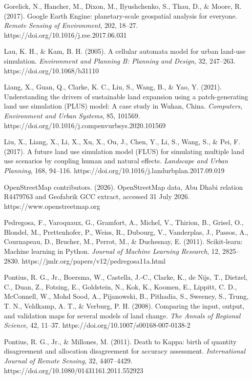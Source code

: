 Gorelick, N., Hancher, M., Dixon, M., Ilyushchenko, S., Thau, D., \&
Moore, R. (2017). Google Earth Engine: planetary-scale geospatial
analysis for everyone. \emph{Remote Sensing of Environment}, 202,
18--27. https://doi.org/10.1016/j.rse.2017.06.031

Lau, K. H., \& Kam, B. H. (2005). A cellular automata model for urban
land-use simulation. \emph{Environment and Planning B: Planning and
Design}, 32, 247--263. https://doi.org/10.1068/b31110

Liang, X., Guan, Q., Clarke, K. C., Liu, S., Wang, B., \& Yao, Y.
(2021). Understanding the drivers of sustainable land expansion using a
patch-generating land use simulation (PLUS) model: A case study in
Wuhan, China. \emph{Computers, Environment and Urban Systems}, 85,
101569. https://doi.org/10.1016/j.compenvurbsys.2020.101569

Liu, X., Liang, X., Li, X., Xu, X., Ou, J., Chen, Y., Li, S., Wang, S.,
\& Pei, F. (2017). A future land use simulation model (FLUS) for
simulating multiple land use scenarios by coupling human and natural
effects. \emph{Landscape and Urban Planning}, 168, 94--116.
https://doi.org/10.1016/j.landurbplan.2017.09.019

OpenStreetMap contributors. (2026). OpenStreetMap data, Abu Dhabi
relation R4479763 and Geofabrik GCC extract, accessed 31 July 2026.
https://www.openstreetmap.org

Pedregosa, F., Varoquaux, G., Gramfort, A., Michel, V., Thirion, B.,
Grisel, O., Blondel, M., Prettenhofer, P., Weiss, R., Dubourg, V.,
Vanderplas, J., Passos, A., Cournapeau, D., Brucher, M., Perrot, M., \&
Duchesnay, E. (2011). Scikit-learn: Machine learning in Python.
\emph{Journal of Machine Learning Research}, 12, 2825--2830.
https://jmlr.org/papers/v12/pedregosa11a.html

Pontius, R. G., Jr., Boersma, W., Castella, J.-C., Clarke, K., de Nijs,
T., Dietzel, C., Duan, Z., Fotsing, E., Goldstein, N., Kok, K., Koomen,
E., Lippitt, C. D., McConnell, W., Mohd Sood, A., Pijanowski, B.,
Pithadia, S., Sweeney, S., Trung, T. N., Veldkamp, A. T., \& Verburg, P.
H. (2008). Comparing the input, output, and validation maps for several
models of land change. \emph{The Annals of Regional Science}, 42,
11--37. https://doi.org/10.1007/s00168-007-0138-2

Pontius, R. G., Jr., \& Millones, M. (2011). Death to Kappa: birth of
quantity disagreement and allocation disagreement for accuracy
assessment. \emph{International Journal of Remote Sensing}, 32,
4407--4429. https://doi.org/10.1080/01431161.2011.552923

